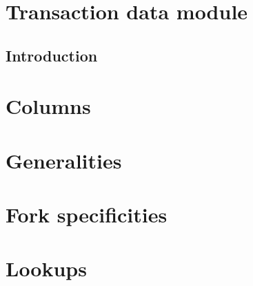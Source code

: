 
\section{Transaction data module}   \label{user txn data: generalities}
\subsection{Introduction}           \label{user txn data: intro}               
\section{Columns}                   \label{user txn data: columns}             

\section{Generalities}              \label{user txn data: generalities}        
\section{Fork specificities}        \label{user txn data: fork specificities}  
\iffalse  \fi                       \label{user txn data: processing}          
\section{Lookups}                   \label{user txn data: lookups}             
